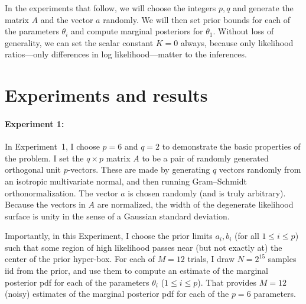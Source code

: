\documentclass[10pt]{article}
\begin{document}
In the experiments that follow, we will choose the integers $p, q$ and generate the matrix $A$ and the vector $a$ randomly.
We will then set prior bounds for each of the parameters $\theta_i$ and compute marginal posteriors for $\theta_1$.
Without loss of generality, we can set the scalar constant $K=0$ always, because only likelihood ratios---only differences in log likelihood---matter to the inferences.

\section{Experiments and results}
\paragraph{Experiment 1:}
In Experiment~1, I choose $p=6$ and $q=2$ to demonstrate the basic properties of the problem.
I set the $q\times p$ matrix $A$ to be a pair of randomly generated orthogonal unit $p$-vectors.
These are made by generating $q$ vectors randomly from an isotropic multivariate normal, and then running Gram--Schmidt orthonormalization.
The vector $a$ is chosen randomly (and is truly arbitrary).
Because the vectors in $A$ are normalized, the width of the degenerate likelihood surface is unity in the sense of a Gaussian standard deviation.

Importantly, in this Experiment, I choose the prior limits $a_i, b_i$ (for all $1\leq i\leq p$) such that some region of high likelihood passes near (but not exactly at) the center of the prior hyper-box.
For each of $M=12$ trials, I draw $N=2^{15}$ samples iid from the prior, and use them to compute an estimate of the marginal posterior pdf for each of the parameters $\theta_i$ ($1\leq i\leq p$).
That provides $M=12$ (noisy) estimates of the marginal posterior pdf for each of the $p=6$ parameters.
\end{document}
